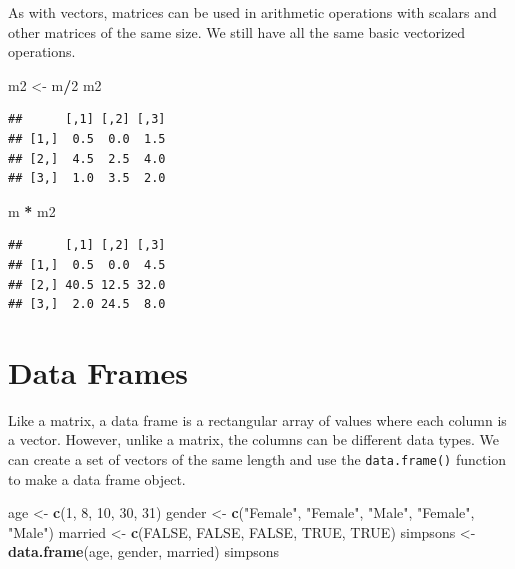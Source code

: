 \documentclass[
]{book}
\newenvironment{Shaded}{\begin{snugshade}}{\end{snugshade}}
\newcommand{\DecValTok}[1]{\textcolor[rgb]{0.00,0.00,0.81}{#1}}
\newcommand{\KeywordTok}[1]{\textcolor[rgb]{0.13,0.29,0.53}{\textbf{#1}}}
\newcommand{\NormalTok}[1]{#1}
\newcommand{\OperatorTok}[1]{\textcolor[rgb]{0.81,0.36,0.00}{\textbf{#1}}}
\newcommand{\OtherTok}[1]{\textcolor[rgb]{0.56,0.35,0.01}{#1}}
\newcommand{\StringTok}[1]{\textcolor[rgb]{0.31,0.60,0.02}{#1}}
\begin{document}
As with vectors, matrices can be used in arithmetic operations with scalars and other matrices of the same size. We still have all the same basic vectorized operations.

\begin{Shaded}
\begin{Highlighting}[]
\NormalTok{m2 <-}\StringTok{ }\NormalTok{m}\OperatorTok{/}\DecValTok{2}
\NormalTok{m2}
\end{Highlighting}
\end{Shaded}

\begin{verbatim}
##      [,1] [,2] [,3]
## [1,]  0.5  0.0  1.5
## [2,]  4.5  2.5  4.0
## [3,]  1.0  3.5  2.0
\end{verbatim}

\begin{Shaded}
\begin{Highlighting}[]
\NormalTok{m }\OperatorTok{*}\StringTok{ }\NormalTok{m2}
\end{Highlighting}
\end{Shaded}

\begin{verbatim}
##      [,1] [,2] [,3]
## [1,]  0.5  0.0  4.5
## [2,] 40.5 12.5 32.0
## [3,]  2.0 24.5  8.0
\end{verbatim}

\hypertarget{data-frames}{%
\section{Data Frames}\label{data-frames}}

Like a matrix, a data frame is a rectangular array of values where each column is a vector. However, unlike a matrix, the columns can be different data types. We can create a set of vectors of the same length and use the \texttt{data.frame()} function to make a data frame object.

\begin{Shaded}
\begin{Highlighting}[]
\NormalTok{age <-}\StringTok{ }\KeywordTok{c}\NormalTok{(}\DecValTok{1}\NormalTok{, }\DecValTok{8}\NormalTok{, }\DecValTok{10}\NormalTok{, }\DecValTok{30}\NormalTok{,}
    \DecValTok{31}\NormalTok{)}
\NormalTok{gender <-}\StringTok{ }\KeywordTok{c}\NormalTok{(}\StringTok{"Female"}\NormalTok{,}
    \StringTok{"Female"}\NormalTok{, }\StringTok{"Male"}\NormalTok{,}
    \StringTok{"Female"}\NormalTok{, }\StringTok{"Male"}\NormalTok{)}
\NormalTok{married <-}\StringTok{ }\KeywordTok{c}\NormalTok{(}\OtherTok{FALSE}\NormalTok{, }\OtherTok{FALSE}\NormalTok{,}
    \OtherTok{FALSE}\NormalTok{, }\OtherTok{TRUE}\NormalTok{, }\OtherTok{TRUE}\NormalTok{)}
\NormalTok{simpsons <-}\StringTok{ }\KeywordTok{data.frame}\NormalTok{(age,}
\NormalTok{    gender, married)}
\NormalTok{simpsons}
\end{Highlighting}
\end{Shaded}
\end{document}
